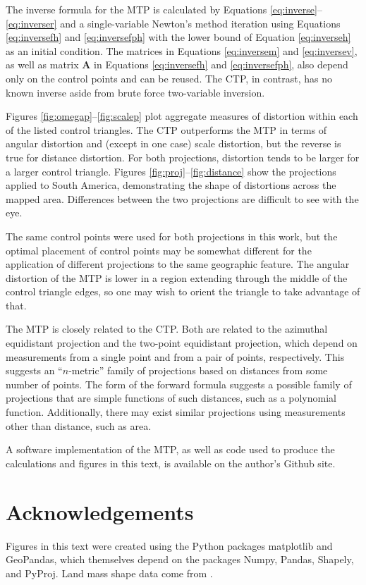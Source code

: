 \documentclass[]{interact}
\begin{document}
The inverse formula for the MTP is calculated by Equations
\ref{eq:inverse}--\ref{eq:inverser} and a single-variable Newton's method
iteration using Equations \ref{eq:inversefh} and \ref{eq:inversefph} with the
lower bound of Equation \ref{eq:inverseh} as an initial condition. The matrices
in Equations \ref{eq:inversem} and \ref{eq:inversev}, as well
as matrix $\mathbf A$ in Equations \ref{eq:inversefh} and \ref{eq:inversefph},
also depend only on the control points and can be reused. The CTP,
in contrast, has no known inverse aside from brute force two-variable inversion.

Figures \ref{fig:omegap}--\ref{fig:scalep} plot aggregate measures of distortion
within each of the listed control triangles. The CTP outperforms the MTP in
terms of angular distortion and (except in
one case) scale distortion, but the reverse is true for distance distortion. For
both projections, distortion tends to be larger for a larger control triangle.
Figures \ref{fig:proj}--\ref{fig:distance} show the projections applied to
South America, demonstrating the shape of distortions across the mapped area.
Differences between the two projections are difficult to see with the eye.

The same control points were used for both projections in this work, but the
optimal placement of control points may be somewhat different for the
application of different projections to the same geographic feature.
The angular distortion of the MTP is lower
in a region extending through the middle of the control triangle edges,
so one may wish to orient the triangle to take advantage of that.

The MTP is closely related to the CTP. Both are related to the azimuthal
equidistant projection and the two-point equidistant projection, which depend
on measurements from a single point and from a pair of points, respectively.
\citep{snyder87} This suggests an ``$n$-metric'' family of projections based on
distances from some number of points. The form of the forward formula suggests
a possible family of projections that are simple functions of such distances,
such as a polynomial function. Additionally, there may exist
similar projections using measurements other than distance, such as area.

A software implementation of the MTP, as well as code used to
produce the calculations and figures in this text,
is available on the author's Github site. \citep{blind}%

\section{Acknowledgements}
Figures in this text were created using the Python packages matplotlib and
GeoPandas, which themselves depend on the packages Numpy, Pandas,
Shapely, and PyProj. Land mass shape data come from \citet{natearth}.



\end{document}
